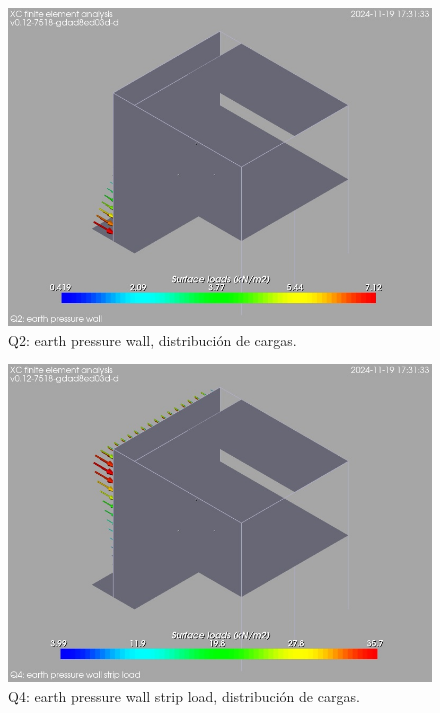 \begin{figure}[ht]
\begin{center}
\includegraphics[width=\linewidth]{results/graphics/loads/QearthPressWalloverallSet}
\caption{Q2: earth pressure wall, distribución de cargas.}
\label{QearthPressWalloverallSet}
\end{center}
\end{figure}
\begin{figure}[ht]
\begin{center}
\includegraphics[width=\linewidth]{results/graphics/loads/QearthPWallStrLoverallSet}
\caption{Q4: earth pressure wall strip load, distribución de cargas.}
\label{QearthPWallStrLoverallSet}
\end{center}
\end{figure}
